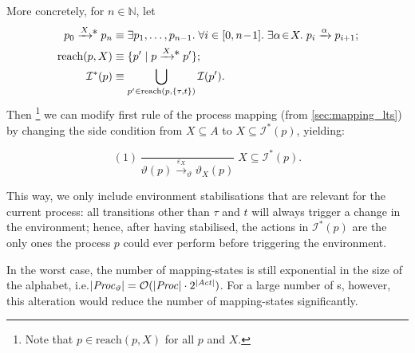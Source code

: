 \begin{isabellebody}
\begin{isamarkuptext}
More concretely, for $n \in \mathbb{N}$, let 
\begin{align*}
    p_0 \xrightarrow{X}\!\!\raisebox{1pt}{*}\; p_n &\equiv \exists p_1,\dots,p_{n-1} .\;
    \forall i \in [0,n\!-\!1] .\; \exists \alpha\!\in\!X .\; p_i \xrightarrow{\alpha} p_{i+1}; \\
    \text{reach}(p,X) &\equiv \{ p' \mid p \xrightarrow{X}\!\!\raisebox{1pt}{*}\; p' \}; \\
    \mathcal{I}^*(p) &\equiv \bigcup_{p' \in \text{reach}(p,\{\tau,t\})} \mathcal{I}(p').
\end{align*}
Then%
\footnote{Note that $p \in \text{reach}(p,X)$ for all $p$ and $X$.}
we can modify first rule of the process mapping (from \cref{sec:mapping_lts}) by changing the side condition from $X \subseteq A$ to $X \subseteq \mathcal{I}^*(p)$, yielding:

$$
(1)\,\frac{}{\vartheta(p) \xrightarrow{\varepsilon_X}_\vartheta \vartheta_X(p)} \; X \subseteq \mathcal{I}^*(p).
$$

This way, we only include environment stabilisations that are relevant for the current process: all transitions other than $\tau$ and $t$ will always trigger a change in the environment; hence, after having stabilised, the actions in $\mathcal{I}^*(p)$ are the only ones the process $p$ could ever perform before triggering the environment.

In the worst case, the number of mapping-states is still exponential in the size of the alphabet, i.e.\@ $|\mathit{Proc}_\vartheta| = \mathcal{O}(|\mathit{Proc}| \cdot 2^{|\mathit{Act}|})$. For a large number of \LTSt{}s, however, this alteration would reduce the number of mapping-states significantly.


\end{isamarkuptext}
\end{isabellebody}
